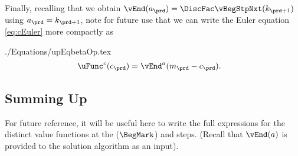 \documentclass[\econtexRoot/SolvingMicroDSOPs]{subfiles}
\begin{document}
Finally, recalling that we obtain $\vEnd({a}_{\prd}) = \DiscFac \vBegStpNxt({k}_{\prd+1})$ using ${a}_{\prd} = {k}_{\prd+1}$, note for future use that we can write the Euler equation \eqref{eq:cEuler} more compactly as
\begin{verbatimwrite}{./Equations/upEqbetaOp.tex}
  \begin{equation}\begin{gathered}\begin{aligned}
        \uFunc^{{c}}({c}_{\prd})   & = \vEnd^{{a}}({m}_{\prd}-{c}_{\prd}).
        \label{eq:upEqbetaOp}
      \end{aligned}\end{gathered}\end{equation}
\end{verbatimwrite}
\unskip


\hypertarget{summing-up}{}
\subsection{Summing Up}\label{subsec:summing-up}
For future reference, it will be useful here to write the full expressions for the distinct value functions at the {\Arrival} ($\BegMark$) and {\Decision} steps.  (Recall that $\vEnd(a)$ is provided to the solution algorithm as an input).
\end{document}
